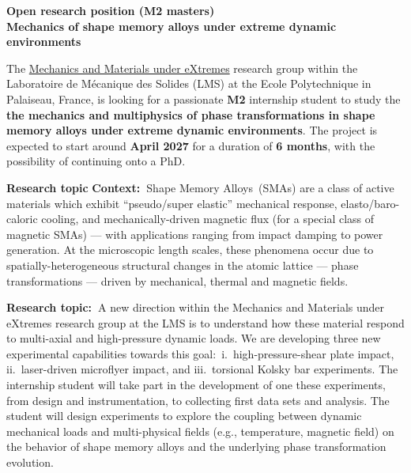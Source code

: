 \documentclass[a4paper,11pt,fleqn]{article}
\begin{document}
	\setlength{\abovedisplayskip}{2 pt}
	\setlength{\belowdisplayskip}{2 pt}
	\sffamily
	\thispagestyle{titlepage}
	\begin{center}
		\vspace*{0em}
		\Large \textbf{Open research position (M2 masters) \\ Mechanics of shape memory alloys under extreme dynamic environments} 
	\end{center}
	
	The \href{https://vigneshkannan-group.github.io/vk-mxm-website/}{Mechanics and Materials under eXtremes} research group within the Laboratoire de M{\'e}canique des Solides (LMS) at the Ecole Polytechnique in Palaiseau, France, is looking for a passionate \textbf{M2} internship student to study the \textbf{the mechanics and multiphysics of phase transformations in shape memory alloys under extreme dynamic environments}. The project is expected to start around \textbf{April 2027} for a duration of \textbf{6 months}, with the possibility of continuing onto a PhD.

	\begin{myhlbox}{\textbf{Research topic}}
		\textbf{Context:~}Shape Memory Alloys~(SMAs) are a class of active materials which exhibit ``pseudo/super elastic'' mechanical response, elasto/baro-caloric cooling, and mechanically-driven magnetic flux (for a special class of magnetic SMAs) --- with applications ranging from impact damping to power generation. At the microscopic length scales, these phenomena occur due to spatially-heterogeneous structural changes in the atomic lattice --- phase transformations --- driven by mechanical, thermal and magnetic fields. 
		
		\textbf{Research topic:~}A new direction within the Mechanics and Materials under eXtremes research group at the LMS is to understand how these material respond to multi-axial and high-pressure dynamic loads. We are developing three new experimental capabilities towards this goal:~i.~high-pressure-shear plate impact, ii.~laser-driven microflyer impact, and iii.~torsional Kolsky bar experiments. The internship student will take part in the development of one these experiments, from design and instrumentation, to collecting first data sets and analysis. The student will design experiments to explore the coupling between dynamic mechanical loads and multi-physical fields (e.g., temperature, magnetic field) on the behavior of shape memory alloys and the underlying phase transformation evolution.
	
	\end{myhlbox}
	
\end{document}
